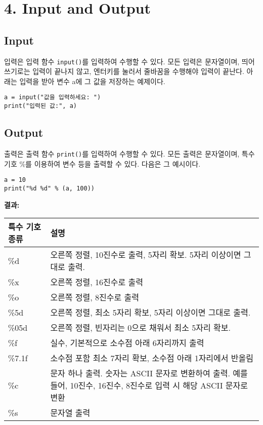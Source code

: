 \section[4. Input and Output - {\it 입력과 출력}]{4. Input and Output}

\subsection{Input}

입력은 입력 함수 \texttt{input()}를 입력하여 수행할 수 있다. 모든 입력은 문자열이며, 띄어쓰기로는 입력이 끝나지 않고, 엔터키를 눌러서 줄바꿈을 수행해야 입력이 끝난다. 아래는 입력을 받아 변수 a에 그 값을 저장하는 예제이다.

\begin{tcolorbox}[colframe=black, colback=white]
\begin{verbatim}
a = input("값을 입력하세요: ")
print("입력된 값:", a)
\end{verbatim}
\end{tcolorbox}

\subsection{Output}

출력은 출력 함수 \texttt{print()}를 입력하여 수행할 수 있다. 모든 출력은 문자열이며, 특수 기호 \%를 이용하여 변수 등을 출력할 수 있다. 다음은 그 예시이다.

\begin{minipage}{\textwidth} %
\begin{tcolorbox}[colframe=black, colback=white]
\begin{verbatim}
a = 10
print("%d %d" % (a, 100))
\end{verbatim}
\end{tcolorbox}
\textbf{결과: }
\end{minipage}

\begin{longtable}[]{@{}p{4cm} p{10cm}@{}}
    \toprule
    특수 기호 종류 & 설명 \\
    \midrule
    \endhead
    \%d & 오른쪽 정렬, 10진수로 출력, 5자리 확보. 5자리 이상이면 그대로 출력. \\
    \%x & 오른쪽 정렬, 16진수로 출력 \\
    \%o & 오른쪽 정렬, 8진수로 출력 \\
    \%5d & 오른쪽 정렬, 최소 5자리 확보, 5자리 이상이면 그대로 출력. \\
    \%05d & 오른쪽 정렬, 빈자리는 0으로 채워서 최소 5자리 확보. \\
    \%f & 실수, 기본적으로 소수점 아래 6자리까지 출력 \\
    \%7.1f & 소수점 포함 최소 7자리 확보, 소수점 아래 1자리에서 반올림 \\
    \%c & 문자 하나 출력. 숫자는 ASCII 문자로 변환하여 출력. 예를 들어, 10진수, 16진수, 8진수로 입력 시 해당 ASCII 문자로 변환\\
    \%s & 문자열 출력 \\
    \bottomrule
\end{longtable}

